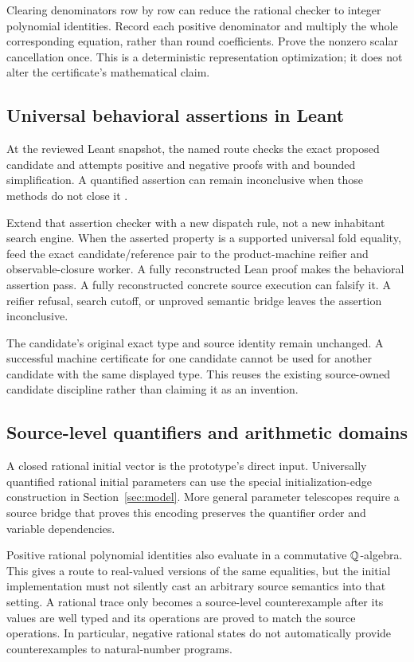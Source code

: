 Clearing denominators row by row can reduce the rational checker to integer
polynomial identities. Record each positive denominator and multiply the
whole corresponding equation, rather than round coefficients. Prove the
nonzero scalar cancellation once. This is a deterministic representation
optimization; it does not alter the certificate's mathematical claim.

\subsection{Universal behavioral assertions in Leant}
At the reviewed Leant snapshot, the named 
route checks the exact proposed candidate and attempts positive and negative
proofs with  and bounded simplification. A quantified assertion can
remain inconclusive when those methods do not close it
\cite{leant-behavior}.

Extend that assertion checker with a new dispatch rule, not a new inhabitant
search engine. When the asserted property is a supported universal fold
equality, feed the exact candidate/reference pair to the product-machine
reifier and observable-closure worker. A fully reconstructed Lean proof makes
the behavioral assertion pass. A fully reconstructed concrete source execution
can falsify it. A reifier refusal, search cutoff, or unproved semantic bridge
leaves the assertion inconclusive.

The candidate's original exact type and source identity remain unchanged.
A successful machine certificate for one candidate cannot be used for another
candidate with the same displayed type. This reuses the existing source-owned
candidate discipline rather than claiming it as an invention.

\subsection{Source-level quantifiers and arithmetic domains}
A closed rational initial vector is the prototype's direct input. Universally
quantified rational initial parameters can use the special initialization-edge
construction in Section~\ref{sec:model}. More general parameter telescopes
require a source bridge that proves this encoding preserves the quantifier
order and variable dependencies.

Positive rational polynomial identities also evaluate in a commutative
$\mathbb Q$-algebra. This gives a route to real-valued versions of the same equalities,
but the initial implementation must not silently cast an arbitrary source
semantics into that setting. A rational trace only becomes a source-level
counterexample after its values are well typed and its operations are proved
to match the source operations. In particular, negative rational states do not
automatically provide counterexamples to natural-number programs.

